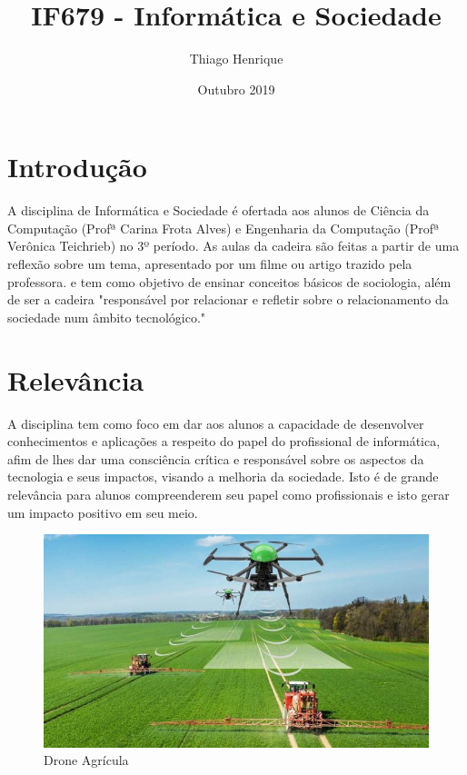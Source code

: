 \documentclass[a4 paper, 10pt]{article}
\title{IF679 - Informática e Sociedade}
\author{Thiago Henrique}
\date{Outubro 2019}
\begin{document}
\maketitle

\section{Introdução}

\quad A disciplina de Informática e Sociedade é ofertada aos alunos de Ciência da Computação (Profª Carina Frota Alves) e Engenharia da Computação (Profª Verônica Teichrieb) no 3º período. As aulas da cadeira são feitas a partir de uma reflexão sobre um tema, apresentado por um filme ou artigo trazido pela professora. e tem como objetivo de ensinar conceitos básicos de sociologia, além de ser a cadeira "responsável por relacionar e refletir sobre o relacionamento da sociedade num âmbito tecnológico." \cite{sitepet}

\section{Relevância}
\quad 
A disciplina tem como foco em dar aos alunos a capacidade de desenvolver conhecimentos e aplicações a respeito do papel do profissional de informática, afim de lhes dar uma consciência crítica e responsável sobre os aspectos da tecnologia e seus impactos, visando a melhoria da sociedade. Isto é de grande relevância para alunos compreenderem seu papel como profissionais e isto gerar um impacto positivo em seu meio.

\begin{figure}[h!]
\centering
\includegraphics[scale=0.45]{drone-agricola.jpg}
\caption{Drone Agrícula \cite{drone}}
\label{fig:drone-agricola.jpg}
\end{figure}
\end{document}
